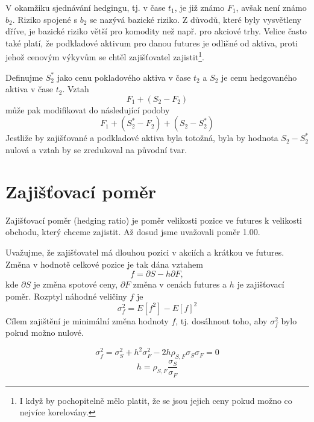 \documentclass[a4paper]{book}
\begin{document}
V okamžiku sjednávání hedgingu, tj. v čase $t_1$, je již známo $F_1$, avšak není známo $b_2$. Riziko spojené s $b_2$ se nazývá bazické riziko. Z důvodů, které byly vysvětleny dříve, je bazické riziko větší pro komodity než např. pro akciové trhy.
Velice často také platí, že podkladové aktivum pro danou futures je odlišné od aktiva, proti jehož cenovým výkyvům se chtěl zajišťovatel zajistit\footnote{I když by pochopitelně mělo platit, že se jsou jejich ceny pokud možno co nejvíce korelovány.}.

Definujme $S_2^*$ jako cenu pokladového aktiva v čase $t_2$ a $S_2$ je cenu hedgovaného aktiva v čase $t_2$. Vztah
\begin{equation*}
F_1 + (S_2 - F_2)
\end{equation*}
může pak modifikovat do následující podoby
\begin{equation*}
F_1 + (S_2^* - F_2) + (S_2 - S_2^*)
\end{equation*}
Jestliže by zajišťované a podkladové aktiva byla totožná, byla by hodnota $S_2 - S_2^*$ nulová a vztah by se zredukoval na původní tvar.

\section{Zajišťovací poměr}

Zajišťovací poměr (hedging ratio) je poměr velikosti pozice ve futures k velikosti obchodu, který chceme zajistit. Až dosud jsme uvažovali poměr 1.00.

Uvažujme, že zajišťovatel má dlouhou pozici v akciích a krátkou ve futures. Změna v hodnotě celkové pozice je tak dána vztahem
\begin{equation*}
f = \partial S - h \partial F, 
\end{equation*}
kde $\partial S$ je změna spotové ceny, $\partial F$ změna v cenách futures a $h$ je zajišťovací poměr.
\noindent Rozptyl náhodné veličiny $f$ je
\begin{equation*}
\sigma_f^2 = E[f^2] - E[f]^2
\end{equation*}
Cílem zajištění je minimální změna hodnoty $f$, tj. dosáhnout toho, aby $\sigma_f^2$ bylo pokud možno nulové.

\begin{equation*}
\sigma_f^2 = \sigma_S^2 + h^2 \sigma_F^2 - 2h\rho_{S,F} \sigma_S \sigma_F = 0
\end{equation*}
\begin{equation*}
h = \rho_{S,F} \frac {\sigma_S} {\sigma_F}
\end{equation*}
\end{document}
